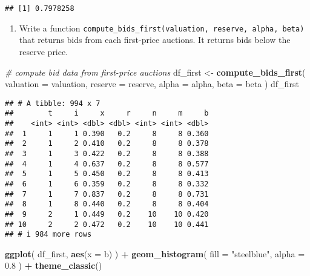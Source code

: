 \documentclass[
]{book}
\newenvironment{Shaded}{\begin{snugshade}}{\end{snugshade}}
\newcommand{\AttributeTok}[1]{\textcolor[rgb]{0.13,0.29,0.53}{#1}}
\newcommand{\CommentTok}[1]{\textcolor[rgb]{0.56,0.35,0.01}{\textit{#1}}}
\newcommand{\FloatTok}[1]{\textcolor[rgb]{0.00,0.00,0.81}{#1}}
\newcommand{\FunctionTok}[1]{\textcolor[rgb]{0.13,0.29,0.53}{\textbf{#1}}}
\newcommand{\NormalTok}[1]{#1}
\newcommand{\OtherTok}[1]{\textcolor[rgb]{0.56,0.35,0.01}{#1}}
\newcommand{\SpecialCharTok}[1]{\textcolor[rgb]{0.81,0.36,0.00}{\textbf{#1}}}
\newcommand{\StringTok}[1]{\textcolor[rgb]{0.31,0.60,0.02}{#1}}
\providecommand{\tightlist}{%
  \setlength{\itemsep}{0pt}\setlength{\parskip}{0pt}}
\begin{document}
\begin{verbatim}
## [1] 0.7978258
\end{verbatim}

\begin{enumerate}
\def\labelenumi{\arabic{enumi}.}
\setcounter{enumi}{4}
\tightlist
\item
  Write a function \texttt{compute\_bids\_first(valuation,\ reserve,\ alpha,\ beta)} that returns bids from each first-price auctions. It returns bids below the reserve price.
\end{enumerate}

\begin{Shaded}
\begin{Highlighting}[]
\CommentTok{\# compute bid data from first{-}price auctions}
\NormalTok{df\_first }\OtherTok{\textless{}{-}} 
  \FunctionTok{compute\_bids\_first}\NormalTok{(}
    \AttributeTok{valuation =}\NormalTok{ valuation, }
    \AttributeTok{reserve =}\NormalTok{ reserve,}
    \AttributeTok{alpha =}\NormalTok{ alpha, }
    \AttributeTok{beta =}\NormalTok{ beta}
\NormalTok{    )}
\NormalTok{df\_first}
\end{Highlighting}
\end{Shaded}

\begin{verbatim}
## # A tibble: 994 x 7
##        t     i     x     r     n     m     b
##    <int> <int> <dbl> <dbl> <int> <int> <dbl>
##  1     1     1 0.390   0.2     8     8 0.360
##  2     1     2 0.410   0.2     8     8 0.378
##  3     1     3 0.422   0.2     8     8 0.388
##  4     1     4 0.637   0.2     8     8 0.577
##  5     1     5 0.450   0.2     8     8 0.413
##  6     1     6 0.359   0.2     8     8 0.332
##  7     1     7 0.837   0.2     8     8 0.731
##  8     1     8 0.440   0.2     8     8 0.404
##  9     2     1 0.449   0.2    10    10 0.420
## 10     2     2 0.472   0.2    10    10 0.441
## # i 984 more rows
\end{verbatim}

\begin{Shaded}
\begin{Highlighting}[]
\FunctionTok{ggplot}\NormalTok{(}
\NormalTok{  df\_first,}
  \FunctionTok{aes}\NormalTok{(}\AttributeTok{x =}\NormalTok{ b)}
\NormalTok{  ) }\SpecialCharTok{+} 
  \FunctionTok{geom\_histogram}\NormalTok{(}
    \AttributeTok{fill =} \StringTok{"steelblue"}\NormalTok{,}
    \AttributeTok{alpha =} \FloatTok{0.8}
\NormalTok{    ) }\SpecialCharTok{+} 
  \FunctionTok{theme\_classic}\NormalTok{()}
\end{Highlighting}
\end{Shaded}
\end{document}
